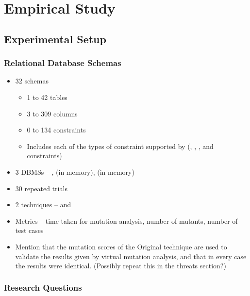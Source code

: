
\section{Empirical Study}
\label{sec:empirical-study}


\subsection{Experimental Setup}
\label{sec:experimental-setup}

\subsubsection{Relational Database Schemas}
\label{sec:subjects}



\begin{itemize}
  \item 32 schemas
    \begin{itemize}
      \item 1 to 42 tables
      \item 3 to 309 columns
      \item 0 to 134 constraints
      \item Includes each of the types of constraint supported by \SchemaAnalyst (\PK, \FK, \NOTNULL, \UNIQUE and \CHECK constraints)
    \end{itemize}
  \item 3 DBMSs -- \Postgres, \HyperSQL (in-memory), \SQLite (in-memory)
  \item 30 repeated trials
  \item 2 techniques -- \Original and \VirtualMutationAnalysis
  \item Metrics -- time taken for mutation analysis, number of mutants, number of test cases
  \item Mention that the mutation scores of the Original technique are used to validate the results given by virtual mutation analysis, and that in every case the results were identical. (Possibly repeat this in the threats section?)
\end{itemize}

\subsubsection{Research Questions}
\label{sec:research-questions}

